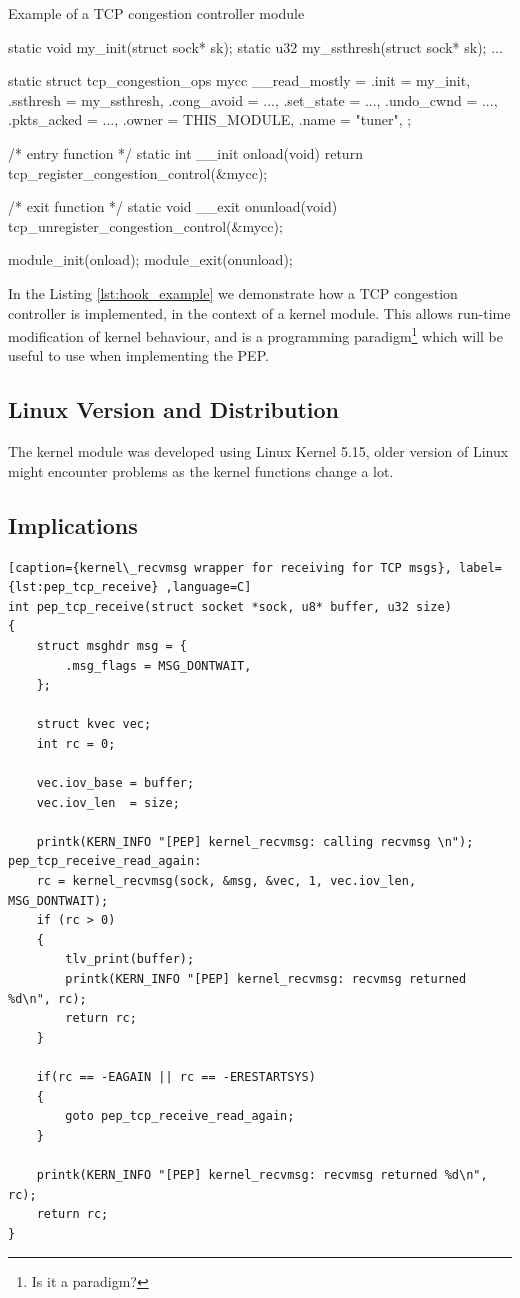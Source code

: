\documentclass[a4paper,english, 11pt]{report}
\begin{document}
\begin{autonumlstlisting}[label=lst:hook_example]{Example of a TCP congestion controller module}

static void my_init(struct sock* sk);
static u32 my_ssthresh(struct sock* sk);
...

static struct tcp_congestion_ops mycc __read_mostly = {
  .init           = my_init,
  .ssthresh       = my_ssthresh,
  .cong_avoid     = ...,
  .set_state      = ...,
  .undo_cwnd      = ...,
  .pkts_acked     = ...,
  .owner          = THIS_MODULE,
  .name           = "tuner",
};

/* entry function */
static int __init onload(void) {
    return tcp_register_congestion_control(&mycc);
}

/* exit function */
static void __exit onunload(void) {
    tcp_unregister_congestion_control(&mycc);
}

module_init(onload);
module_exit(onunload);
\end{autonumlstlisting}
In the Listing \ref{lst:hook_example} we demonstrate how a TCP congestion controller is implemented, in the context of a kernel module. This allows run-time modification of kernel behaviour, and is a programming paradigm\footnote{Is it a paradigm?} which will be useful to use when implementing the PEP.


\subsection{Linux Version and Distribution}
The kernel module was developed using Linux Kernel 5.15, older version of Linux might encounter problems as the kernel functions change a lot.

\subsection{Implications}

\begin{lstlisting}[caption={kernel\_recvmsg wrapper for receiving for TCP msgs}, label={lst:pep_tcp_receive} ,language=C]
int pep_tcp_receive(struct socket *sock, u8* buffer, u32 size)
{
	struct msghdr msg = {
		.msg_flags = MSG_DONTWAIT,
	};

	struct kvec vec;
	int rc = 0;

	vec.iov_base = buffer;
	vec.iov_len  = size;

	printk(KERN_INFO "[PEP] kernel_recvmsg: calling recvmsg \n");
pep_tcp_receive_read_again:
	rc = kernel_recvmsg(sock, &msg, &vec, 1, vec.iov_len, MSG_DONTWAIT);
	if (rc > 0)
	{
		tlv_print(buffer);
		printk(KERN_INFO "[PEP] kernel_recvmsg: recvmsg returned %d\n", rc);
		return rc;
	}

	if(rc == -EAGAIN || rc == -ERESTARTSYS)
	{
		goto pep_tcp_receive_read_again;
	}

	printk(KERN_INFO "[PEP] kernel_recvmsg: recvmsg returned %d\n", rc);
	return rc;
}
\end{lstlisting}
\end{document}
